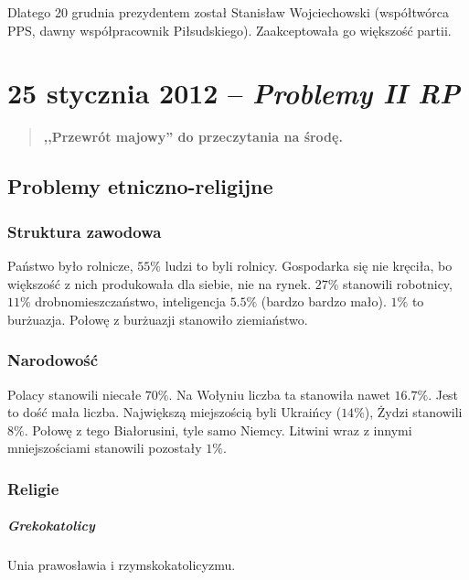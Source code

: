 \documentclass [a4paper, 11pt, oneside]{book}
\begin{document}
        Dlatego 20 grudnia prezydentem został Stanisław Wojciechowski (współtwórca PPS, dawny współpracownik Piłsudskiego). Zaakceptowała go większość partii.
\chapter{25 stycznia 2012 -- \textit{Problemy II RP}} %
\label{cha:25_stycznia_2012_textit}
    \begin{quote}
        \begin{center}
            \bf
            \textcolor{WildStrawberry}{,,Przewrót majowy'' do przeczytania na środę.}
        \end{center}
    \end{quote}
    \section{Problemy etniczno-religijne} %
    \label{sec:problemy_etniczno_religijne}
        \subsection{Struktura zawodowa} %
        \label{sub:struktura_zawodowa}
            Państwo było rolnicze, $55\%$ ludzi to byli rolnicy. Gospodarka się nie kręciła, bo większość z nich produkowała dla siebie, nie na rynek. $27\%$ stanowili robotnicy, $11\%$ drobnomieszczaństwo, inteligencja $5.5\%$ (bardzo bardzo mało). $1\%$ to burżuazja. Połowę z burżuazji stanowiło ziemiaństwo.
        \subsection{Narodowość} %
        \label{sub:narodowo_}
            Polacy stanowili niecałe $70\%$. Na Wołyniu liczba ta stanowiła nawet $16.7\%$. Jest to dość mała liczba. Największą miejszością byli Ukraińcy ($14\%$), Żydzi stanowili $8\%$. Połowę z tego Białorusini, tyle samo Niemcy. Litwini wraz z innymi mniejszościami stanowili pozostały $1\%$.
        \subsection{Religie} %
        \label{sub:religie}
            \paragraph{Grekokatolicy} Unia prawosławia i rzymskokatolicyzmu.
\end{document}
